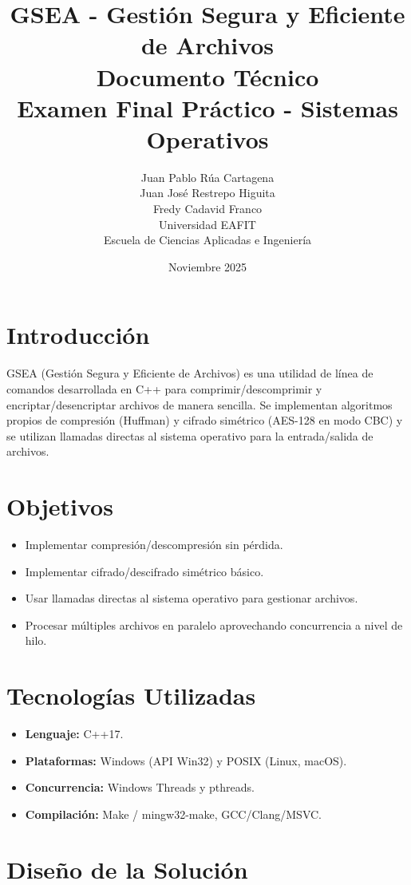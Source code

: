 \documentclass[12pt,a4paper]{article}
\title{
    \textbf{GSEA - Gestión Segura y Eficiente de Archivos}\\
    \large Documento Técnico\\
    \vspace{0.5cm}
    \large Examen Final Práctico - Sistemas Operativos
}
\author{
    Juan Pablo Rúa Cartagena\\
    Juan José Restrepo Higuita\\
    Fredy Cadavid Franco\\[0.3cm]
    Universidad EAFIT\\
    Escuela de Ciencias Aplicadas e Ingeniería
}
\date{Noviembre 2025}
\begin{document}
\maketitle
\newpage

\tableofcontents
\newpage

\section{Introducción}

GSEA (Gestión Segura y Eficiente de Archivos) es una utilidad de línea de comandos desarrollada en C++ para comprimir/descomprimir y encriptar/desencriptar archivos de manera sencilla. Se implementan algoritmos propios de compresión (Huffman) y cifrado simétrico (AES-128 en modo CBC) y se utilizan llamadas directas al sistema operativo para la entrada/salida de archivos.

\section{Objetivos}
\begin{itemize}
    \item Implementar compresión/descompresión sin pérdida.
    \item Implementar cifrado/descifrado simétrico básico.
    \item Usar llamadas directas al sistema operativo para gestionar archivos.
    \item Procesar múltiples archivos en paralelo aprovechando concurrencia a nivel de hilo.
\end{itemize}

\section{Tecnologías Utilizadas}
\begin{itemize}
    \item \textbf{Lenguaje:} C++17.
    \item \textbf{Plataformas:} Windows (API Win32) y POSIX (Linux, macOS).
    \item \textbf{Concurrencia:} Windows Threads y pthreads.
    \item \textbf{Compilación:} Make / mingw32-make, GCC/Clang/MSVC.
\end{itemize}

\section{Diseño de la Solución}
\end{document}
